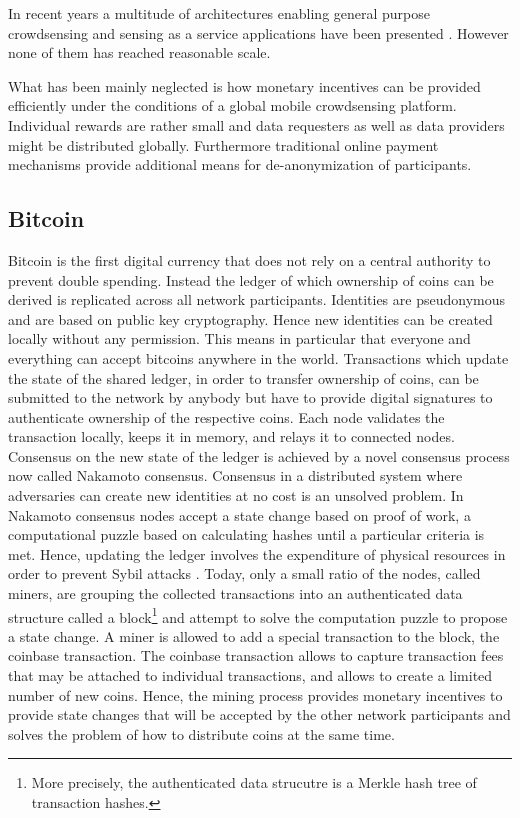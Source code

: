 \documentclass[10pt,journal,compsoc]{IEEEtran}
\begin{document}
In recent years a multitude of architectures enabling general purpose crowdsensing and sensing as a service applications have been presented \cite{6558754,6525603,giannotti2012planetary,Haderer2015,merlino2016mobile}. However none of them has reached reasonable scale.

What has been mainly neglected is how monetary incentives can be provided efficiently under the conditions of a global mobile crowdsensing platform. 
Individual rewards are rather small and data requesters as well as data providers might be distributed globally. Furthermore traditional online payment mechanisms provide additional means for de-anonymization of participants. 

\subsection{Bitcoin}

Bitcoin is the first digital currency that does not rely on a central authority to prevent double spending. Instead the ledger of which ownership of coins can be derived is replicated across all network participants. Identities are pseudonymous and are based on public key cryptography. Hence new identities can be created locally without any permission. This means in particular that everyone and everything can accept bitcoins anywhere in the world. Transactions which update the state of the shared ledger, in order to transfer ownership of coins, can be submitted to the network by anybody but have to provide digital signatures to authenticate ownership of the respective coins. Each node validates the transaction locally, keeps it in memory, and relays it to connected nodes. Consensus on the new state of the ledger is achieved by a novel consensus process now called Nakamoto consensus. Consensus in a distributed system where adversaries can create new identities at no cost is an unsolved problem. In Nakamoto consensus nodes accept a state change based on proof of work, a computational puzzle based on calculating hashes until a particular criteria is met. Hence, updating the ledger involves the expenditure of physical resources in order to prevent Sybil attacks \cite{douceur2002sybil}. Today, only a small ratio of the nodes, called miners, are grouping the collected transactions into an authenticated data structure \cite{Tamassia2003} called a block\footnote{More precisely, the authenticated data strucutre is a Merkle hash tree \cite{merkle1989certified} of transaction hashes.} and attempt to solve the computation puzzle to propose a state change. A miner is allowed to add a special transaction to the block, the coinbase transaction. The coinbase transaction allows to capture transaction fees that may be attached to individual transactions, and allows to create a limited number of new coins. Hence, the mining process provides monetary incentives to provide state changes that will be accepted by the other network participants and solves the problem of how to distribute coins at the same time.
\end{document}
